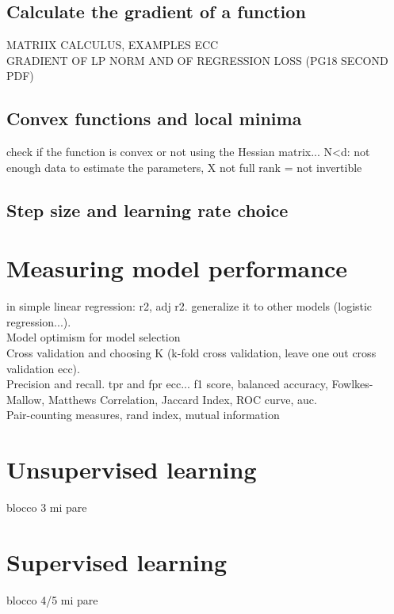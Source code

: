 \documentclass{article}
\begin{document}
\subsection{Calculate the gradient of a function}
MATRIIX CALCULUS, EXAMPLES ECC\\ GRADIENT OF LP NORM AND OF REGRESSION LOSS (PG18 SECOND PDF)
\subsection{Convex functions and local minima}
check if the function is convex or not using the Hessian matrix... N<d: not enough data to estimate the parameters, X not full rank = not invertible\\
\subsection{Step size and learning rate choice}

\section{Measuring model performance}
in simple linear regression: r2, adj r2. generalize it to other models (logistic regression...).\\
Model optimism for model selection\\
Cross validation and choosing K (k-fold cross validation, leave one out cross validation ecc).\\
Precision and recall. tpr and fpr ecc... f1 score, balanced accuracy, Fowlkes-Mallow, Matthews Correlation, Jaccard Index, ROC curve, auc.\\
Pair-counting measures, rand index, mutual information

\section{Unsupervised learning}
blocco 3 mi pare

\section{Supervised learning}
blocco 4/5 mi pare
\end{document}
